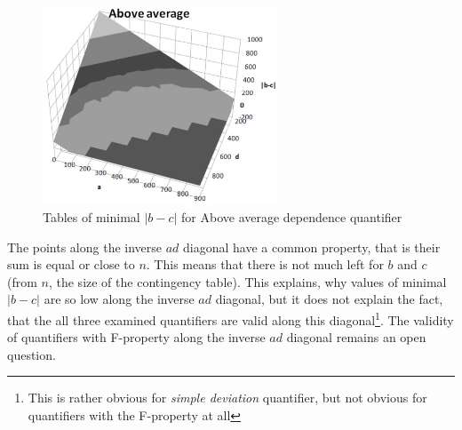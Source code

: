 \begin{figure}[h]
\centering
\includegraphics[width=70mm]{AA.eps}
\caption{Tables of minimal $|b-c|$ for Above average dependence quantifier}
\label{fig:AA}
\end{figure}

The points along the inverse $ad$ diagonal have a common property, that is their sum is equal or close to $n$. This means that there is not much left for $b$ and $c$ (from $n$, the size of the contingency table). This explains, why values of minimal $|b-c|$ are so low along the inverse $ad$ diagonal, but it does not explain the fact, that the all three examined quantifiers are valid along this diagonal\footnote{This is rather obvious for \emph{simple deviation} quantifier, but not obvious for quantifiers with the F-property at all}. The validity of quantifiers with F-property along the inverse $ad$ diagonal remains an open question.